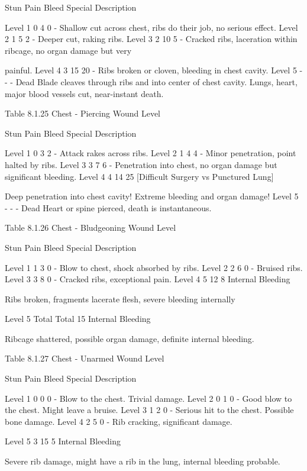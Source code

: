 \documentclass[oneside,11pt,english]{book}
\begin{document}
Stun Pain Bleed Special Description 

Level 1 0 4 0 - Shallow cut across chest, ribs do their job, no serious effect. 
Level 2 1 5 2 - Deeper cut, raking ribs. 
Level 3 2 10 5 - Cracked ribs, laceration within ribcage, no organ damage but very 


painful. 
Level 4 3 15 20 - Ribs broken or cloven, bleeding in chest cavity. 
Level 5 - - - Dead Blade cleaves through ribs and into center of chest cavity. Lungs, 
heart, major blood vessels cut, near-instant death. 

 
Table 8.1.25 Chest - Piercing 
Wound 
Level 

Stun Pain Bleed Special Description 

Level 1 0 3 2 - Attack rakes across ribs. 
Level 2 1 4 4 - Minor penetration, point halted by ribs. 
Level 3 3 7 6 - Penetration into chest, no organ damage but 
significant bleeding. 
Level 4 4 14 25 [Difficult Surgery vs 
Punctured Lung] 

Deep penetration into chest cavity! Extreme 
bleeding and organ damage! 
Level 5 - - - Dead Heart or spine pierced, death is instantaneous. 

 
Table 8.1.26 Chest - Bludgeoning 
Wound 
Level 

Stun Pain Bleed Special Description 

Level 1 1 3 0 - Blow to chest, shock absorbed by ribs. 
Level 2 2 6 0 - Bruised ribs. 
Level 3 3 8 0 - Cracked ribs, exceptional pain. 
Level 4 5 12 8 Internal 
Bleeding 

Ribs broken, fragments lacerate flesh, severe bleeding 
internally 

Level 5 Total Total 15 Internal 
Bleeding 

Ribcage shattered, possible organ damage, definite 
internal bleeding. 

 
Table 8.1.27 Chest - Unarmed 
Wound 
Level 

Stun Pain Bleed Special Description 

Level 1 0 0 0 - Blow to the chest. Trivial damage. 
Level 2 0 1 0 - Good blow to the chest. Might leave a bruise. 
Level 3 1 2 0 - Serious hit to the chest. Possible bone damage. 
Level 4 2 5 0 - Rib cracking, significant damage. 


Level 5 3 15 5 Internal 
Bleeding 

Severe rib damage, might have a rib in the lung, internal 
bleeding probable. 

 

 
\end{document}
